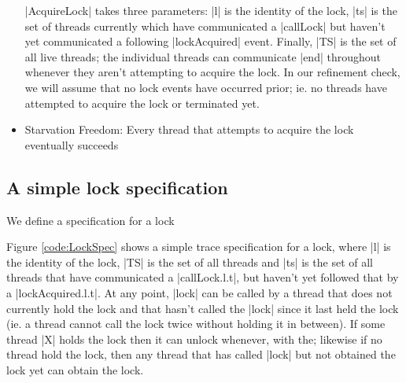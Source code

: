 \begin{itemize}
  |AcquireLock| takes three parameters: |l| is the identity of the lock, |ts| is the set of threads currently which have communicated a |callLock| but haven't yet communicated a following |lockAcquired| event. Finally, |TS| is the set of all live threads; the individual threads can communicate |end| throughout whenever they aren't attempting to acquire the lock. In our refinement check, we will assume that no lock events have occurred prior; ie. no threads have attempted to acquire the lock or terminated yet.
  \item Starvation Freedom: Every thread that attempts to acquire the lock eventually succeeds 
  \label{lockCriteria}
\end{itemize}

\subsection{A simple lock specification} 

We define a specification for a lock 

Figure \ref{code:LockSpec} shows a simple trace specification for a lock, where |l| is the identity of the lock, |TS| is the set of all threads and |ts| is the set of all threads that have communicated a |callLock.l.t|, but haven't yet followed that by a |lockAcquired.l.t|. At any point, |lock| can be called by a thread that does not currently hold the lock and that hasn't called the |lock| since it last held the lock (ie. a thread cannot call the lock twice without holding it in between). If some thread |X| holds the lock then it can unlock whenever, with the; likewise if no thread hold the lock, then any thread that has called |lock| but not obtained the lock yet can obtain the lock.

